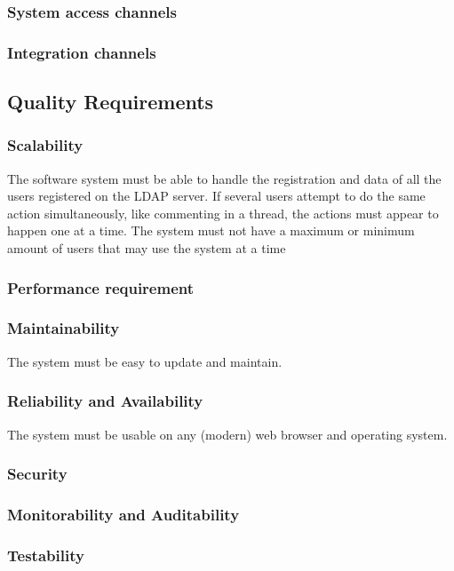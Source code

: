 \documentclass[12pt]{article}
\begin{document}
\subsubsection{System access channels}
\subsubsection{Integration channels}
\subsection{Quality Requirements}
\subsubsection{Scalability}
The software system must be able to handle the registration and data of all the users registered on the LDAP server. 
If several users attempt to do the same action simultaneously, like commenting in a thread, the actions must appear to happen one at a time. 
The system must not have a maximum or minimum amount of users that may use the system at a time
\subsubsection{Performance requirement}

\subsubsection{Maintainability} 
The system must be easy to update and maintain.
\subsubsection{Reliability and Availability} 
The system must be usable on any (modern) web browser and operating system.
\subsubsection{Security}

\subsubsection{Monitorability and Auditability}

\subsubsection{Testability}
\end{document}
